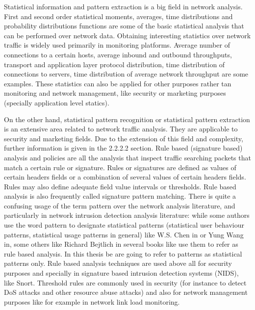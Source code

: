 \documentclass[thesis=M,english]{FITthesis}[2011/07/15]
\begin{document}
Statistical information and pattern extraction is a big field in network analysis. First and second order statistical moments, averages, time distributions and probability distributions functions are some of the basic statistical analysis that can be performed over network data. 
Obtaining interesting statistics over network traffic is widely used primarily in monitoring platforms. Average number of connections to a certain hosts, average inbound and outbound throughputs, transport and application layer protocol distribution, time distribution of connections to servers, time distribution of average network throughput are some examples. These statistics can also be applied for other purposes rather tan monitoring and network management, like security or marketing purposes (specially application level statics).

On the other hand, statistical pattern recognition or statistical pattern extraction is an extensive area related to network traffic analysis. They are applicable to security and
marketing fields. Due to the extension of this field and complexity, further information is given in the 2.2.2.2 section. Rule based (signature based) analysis and policies are all the analysis that inspect traffic searching packets that match a certain rule or signature. Rules or signatures are defined as values of certain headers fields or a combination of several values of certain headers fields. Rules may also define adequate field value intervals or thresholds. Rule based analysis is also frequently called signature pattern matching. There is quite a confusing usage of the term pattern over the network analysis literature, and particularly in network intrusion detection analysis literature: while some authors use the word pattern to designate statistical patterns (statistical user behaviour patterns, statistical usage patterns in general) like W.S. Chen in or Yung Wang in, some others like Richard Bejtlich in several books like use them to refer as rule based analysis. In this thesis be are going to refer to patterns as statistical patterns only. Rule based analysis techniques are used above all for security purposes and specially in signature based intrusion detection systems (NIDS), like Snort. Threshold rules are commonly used in security (for instance to detect DoS attacks and other resource abuse attacks) and also for network management purposes like for example in network link load monitoring.
\end{document}
